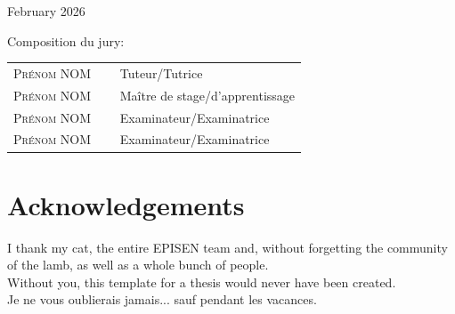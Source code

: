 \begin{titlepage}
\begin{center}
	
			
			\vspace{2cm}
	
			February 2026
		\end{center}
		
		\vspace{1cm}
			
		\vfill
		Composition du jury:
		\begin{center}
			\begin{tabular}{ll}
				\textsc{Prénom NOM}   &  $\quad$ Tuteur/Tutrice\\
				\textsc{Prénom NOM}   &  $\quad$ Maître de stage/d'apprentissage\\
				\textsc{Prénom NOM}   &  $\quad$ Examinateur/Examinatrice\\
				\textsc{Prénom NOM}   &  $\quad$ Examinateur/Examinatrice\\
			\end{tabular}
		\end{center}
    
    \titlepagedecoration
	\newpage
	\thispagestyle{empty}
	\color{colorEPISEN-MEMOIRE}
	
	\section*{Acknowledgements}
	\color{black}
      I thank my cat, the entire EPISEN team and, without forgetting the community of the lamb, as well as a whole bunch of people. \\

	 Without you, this template for a thesis would never have been created.\\

	Je ne vous oublierais jamais... sauf pendant les vacances.
	\end{titlepage}
